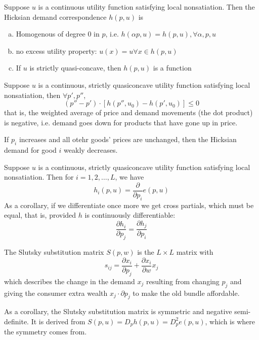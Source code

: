 \begin{prop}
  Suppose $u$ is a continuous utility function satisfying local
  nonsatiation. Then the Hicksian demand correspondence $h(p,u)$ is
  \begin{enumerate}[(a)]
  \item Homogenous of degree $0$ in $p$, i.e. $h(\alpha p, u) = h(p,
    u), \forall \alpha, p, u$
  \item no excess utility property: $u(x) = u \forall x \in h(p,u)$
  \item If $u$ is strictly quasi-concave, then $h(p,u)$ is a function
  \end{enumerate}
\end{prop}

\begin{prop}
  Suppose $u$ is a continuous, strictly quasiconcave utility function
  satisfying local nonsatiation, then $\forall p', p''$,
  \[
  (p'' - p') \cdot [h(p'', u_0) - h(p', u_0)] \leq 0
  \]
  that is, the weighted average of price and demand movements (the dot
  product) is negative, i.e. demand goes down for products that have
  gone up in price.
\end{prop}

\begin{corollary}
  If $p_i$ increases and all otehr goods' prices are unchanged, then
  the Hicksian demand for good $i$ weakly decreases.
\end{corollary}

\begin{prop}
  Suppose $u$ is a continuous, strictly quasiconcave utility function 
  satisfying local nonsatiation. Then for $i = 1, 2, \dots, L$, we have
  \[
  h_i(p,u) = \frac{\partial}{\partial p_i} e(p,u)
  \]
  As a corollary, if we differentiate once more we get cross partials,
  which must be equal, that is, provided $h$ is continuously
  differentiable:
  \[
  \frac{\partial h_i}{\partial p_j} = \frac{\partial h_j}{\partial p_i}
  \]
\end{prop}

\begin{definition}
  The Slutsky substitution matrix $S(p, w)$ is the $L \times L$ matrix with
  \[
  s_{ij} = \frac{\partial x_i}{\partial p_j} + \frac{\partial x_i}{\partial w} x_j
  \]
  which describes the change in the demand $x_j$ resulting from
  changing $p_j$ and giving the consumer extra wealth $x_j
  \cdot \partial p_j$ to make the old bundle affordable.

  As a corollary, the Slutsky substitution matrix is symmetric and
  negative semi-definite. It is derived from $S(p,u) = D_ph(p,u) =
  D^2_pe(p,u)$, which is where the symmetry comes from.
\end{definition}


